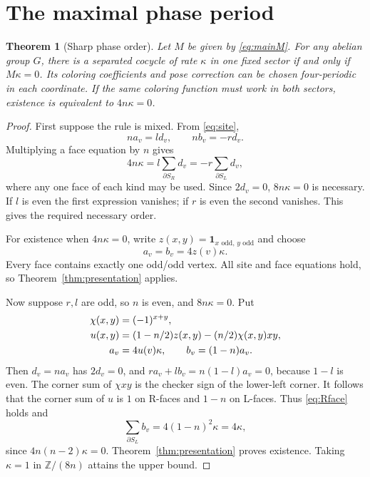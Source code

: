 \documentclass[11pt]{article}
\newtheorem{theorem}{Theorem}[section]
\theoremstyle{definition}
\newcommand{\Z}{\mathbb Z}
\newcommand{\ind}{\mathbf 1}
\begin{document}
\section{The maximal phase period}
\begin{theorem}[Sharp phase order]\label{thm:period}
Let $M$ be given by \eqref{eq:mainM}. For any abelian group $G$, there is a
separated cocycle of rate $\kappa$ in one fixed sector if and only if
$M\kappa=0$. Its coloring coefficients and pose correction can be chosen
four-periodic in each coordinate. If the same coloring function must work in
both sectors, existence is equivalent to $4n\kappa=0$.
\end{theorem}
\begin{proof}
First suppose the rule is mixed. From \eqref{eq:site},
\[
 n a_v=l d_v,\qquad n b_v=-r d_v.
\]
Multiplying a face equation by $n$ gives
\begin{equation}\label{eq:necessaryorder}
 4n\kappa=l\sum_{\partial S_R}d_v
          =-r\sum_{\partial S_L}d_v,
\end{equation}
where any one face of each kind may be used. Since $2d_v=0$,
$8n\kappa=0$ is necessary. If $l$ is even the first expression vanishes; if
$r$ is even the second vanishes. This gives the required necessary order.

For existence when $4n\kappa=0$, write
$z(x,y)=\ind_{x\text{ odd},\,y\text{ odd}}$ and choose
\begin{equation}\label{eq:universalclock}
 a_v=b_v=4z(v)\kappa.
\end{equation}
Every face contains exactly one odd/odd vertex. All site and face equations
hold, so Theorem~\ref{thm:presentation} applies.

Now suppose $r,l$ are odd, so $n$ is even, and $8n\kappa=0$. Put
\begin{align}
 \chi(x,y)&=(-1)^{x+y},\notag\\
 u(x,y)&=(1-n/2)z(x,y)-(n/2)\chi(x,y)xy,\label{eq:u}\\
 a_v&=4u(v)\kappa,\qquad b_v=(1-n)a_v.\label{eq:doubled}
\end{align}
Then $d_v=na_v$ has $2d_v=0$, and
$r a_v+l b_v=n(1-l)a_v=0$, because $1-l$ is even.
The corner sum of $\chi xy$ is the checker sign of the lower-left corner.
It follows that the corner sum of $u$ is $1$ on R-faces and $1-n$ on L-faces.
Thus \eqref{eq:Rface} holds and
\[
 \sum_{\partial S_L}b_v=4(1-n)^2\kappa=4\kappa,
\]
since $4n(n-2)\kappa=0$. Theorem~\ref{thm:presentation} proves existence.
Taking $\kappa=1$ in $\Z/(8n)$ attains the upper bound.


\end{proof}
\end{document}
